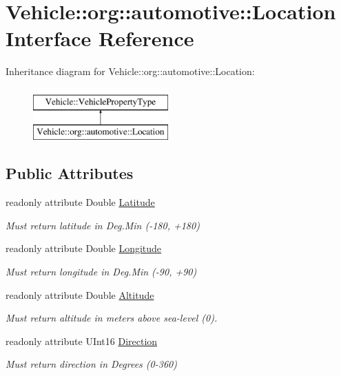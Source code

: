 \hypertarget{interfaceVehicle_1_1org_1_1automotive_1_1Location}{\section{Vehicle\-:\-:org\-:\-:automotive\-:\-:Location Interface Reference}
\label{interfaceVehicle_1_1org_1_1automotive_1_1Location}
}
Inheritance diagram for Vehicle\-:\-:org\-:\-:automotive\-:\-:Location\-:\begin{figure}[H]
\begin{center}
\leavevmode
\includegraphics[height=2.000000cm]{interfaceVehicle_1_1org_1_1automotive_1_1Location}
\end{center}
\end{figure}
\subsection*{Public Attributes}
\begin{DoxyCompactItemize}
\item 
readonly attribute Double \hyperlink{interfaceVehicle_1_1org_1_1automotive_1_1Location_a2e58af2d4ca65b89a5f33c23fd011db3}{Latitude}
\begin{DoxyCompactList}\small\item\em Must return latitude in Deg.\-Min (-\/180, +180) \end{DoxyCompactList}\item 
readonly attribute Double \hyperlink{interfaceVehicle_1_1org_1_1automotive_1_1Location_a04b8c8295470ba6d014d352b816ec639}{Longitude}
\begin{DoxyCompactList}\small\item\em Must return longitude in Deg.\-Min (-\/90, +90) \end{DoxyCompactList}\item 
readonly attribute Double \hyperlink{interfaceVehicle_1_1org_1_1automotive_1_1Location_aacfa07466cfe32a663506f3171523ee7}{Altitude}
\begin{DoxyCompactList}\small\item\em Must return altitude in meters above sea-\/level (0). \end{DoxyCompactList}\item 
readonly attribute U\-Int16 \hyperlink{interfaceVehicle_1_1org_1_1automotive_1_1Location_ad21a6330593354e621d2462733286e72}{Direction}
\begin{DoxyCompactList}\small\item\em Must return direction in Degrees (0-\/360) \end{DoxyCompactList}\end{DoxyCompactItemize}


